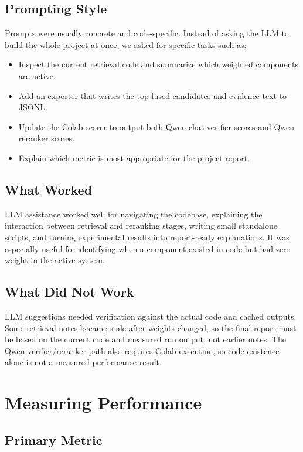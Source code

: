 \documentclass[11pt]{article}
\begin{document}
\subsection{Prompting Style}

Prompts were usually concrete and code-specific. Instead of asking the LLM to build the whole project at once, we asked for specific tasks such as:

\begin{itemize}[leftmargin=*]
  \item Inspect the current retrieval code and summarize which weighted components are active.
  \item Add an exporter that writes the top fused candidates and evidence text to JSONL.
  \item Update the Colab scorer to output both Qwen chat verifier scores and Qwen reranker scores.
  \item Explain which metric is most appropriate for the project report.
\end{itemize}

\subsection{What Worked}

LLM assistance worked well for navigating the codebase, explaining the interaction between retrieval and reranking stages, writing small standalone scripts, and turning experimental results into report-ready explanations. It was especially useful for identifying when a component existed in code but had zero weight in the active system.

\subsection{What Did Not Work}

LLM suggestions needed verification against the actual code and cached outputs. Some retrieval notes became stale after weights changed, so the final report must be based on the current code and measured run output, not earlier notes. The Qwen verifier/reranker path also requires Colab execution, so code existence alone is not a measured performance result.

\section{Measuring Performance}

\subsection{Primary Metric}
\end{document}
